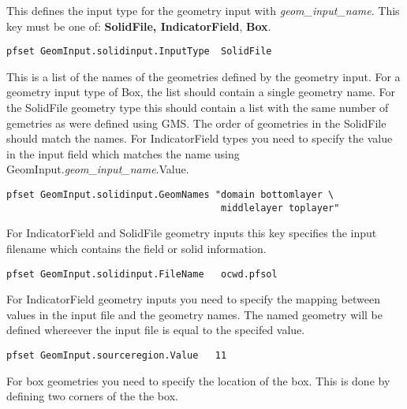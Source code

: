 {
This defines the input type for the geometry input with
{\em geom\_input\_name}.
This key must be one of: {\bf SolidFile, IndicatorField}, {\bf Box}.
}
\begin{display}\begin{verbatim}
pfset GeomInput.solidinput.InputType  SolidFile
\end{verbatim}\end{display}

{
This is a list of the names of the geometries defined by the geometry
input.  For a geometry input type of Box, the list should contain a
single geometry name.  For the SolidFile geometry type this should
contain a list with the same number of gemetries as were defined
using GMS.  The order of geometries in the SolidFile should match the
names.  For IndicatorField types you need to specify the value in the
input field which matches the name using
GeomInput.{\em geom\_input\_name}.Value.
}
\begin{display}\begin{verbatim}
pfset GeomInput.solidinput.GeomNames "domain bottomlayer \
                                      middlelayer toplayer"
\end{verbatim}\end{display}

{
For IndicatorField and SolidFile geometry inputs this key specifies
the input filename which contains the field or solid information.
}
\begin{display}\begin{verbatim}
pfset GeomInput.solidinput.FileName   ocwd.pfsol
\end{verbatim}\end{display}


{
For IndicatorField geometry inputs you need to specify the mapping between
values in the input file and the geometry names.  The named geometry will
be defined whereever the input file is equal to the specifed value.
}
\begin{display}\begin{verbatim}
pfset GeomInput.sourceregion.Value   11
\end{verbatim}\end{display}

For box geometries you need to specify the location of the box.  This
is done by defining two corners of the the box.

